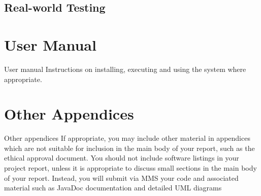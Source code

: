 \documentclass[11pt,a4paper,notitlepage]{report}
\begin{document}
	\subsection*{Real-world Testing}
	
	\section*{User Manual}
	User manual Instructions on installing, executing and using the
	system where appropriate.
	
	\section*{Other Appendices}
	Other
	appendices
	If appropriate, you may include other material in
	appendices which are not suitable for inclusion in the
	main body of your report, such as the ethical approval
	document.
	You should not include software listings in your project report, unless it is
	appropriate to discuss small sections in the main body of your report. Instead,
	you will submit via MMS your code and associated material such as JavaDoc
	documentation and detailed UML diagrams
	
\end{document}
